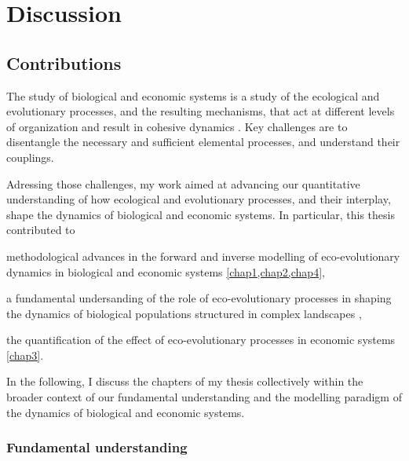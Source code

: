 %
\newcommand{\chapi}{\cref{diff-in-graphs}}
\newcommand{\chapii}{\cref{diff-in-graphs}}
\newcommand{\chapiii}{\cref{diff-in-graphs}}
\newcommand{\chapiv}{\cref{diff-in-graphs}}

\chapter{Discussion}
\label{sec:conclusion}



\section{Contributions}
The study of biological and economic systems is a study of the ecological and evolutionary processes, and the resulting mechanisms, that act at different levels of organization and result in cohesive dynamics \cite{Levin2002}.
% 
Key challenges are to disentangle the necessary and sufficient elemental processes, and understand their couplings. 

Adressing those challenges, my work aimed at advancing our quantitative understanding of how ecological and evolutionary processes, and their interplay, shape the dynamics of biological and economic systems. In particular, this thesis contributed to 
% 
\begin{mylisti}
    \item methodological advances in the forward and inverse modelling of eco-evolutionary dynamics in biological and economic systems \cref{chap1,chap2,chap4},
    \item a fundamental undersanding of the role of eco-evolutionary processes in shaping the dynamics of biological populations structured in complex landscapes \cite{chap1},
    \item the quantification of the effect of eco-evolutionary processes in economic systems \cref{chap3}.
\end{mylisti}

In the following, I discuss the chapters of my thesis collectively within the broader context of our fundamental understanding and the modelling paradigm of the dynamics of biological and economic systems.

\subsection{Fundamental understanding}


